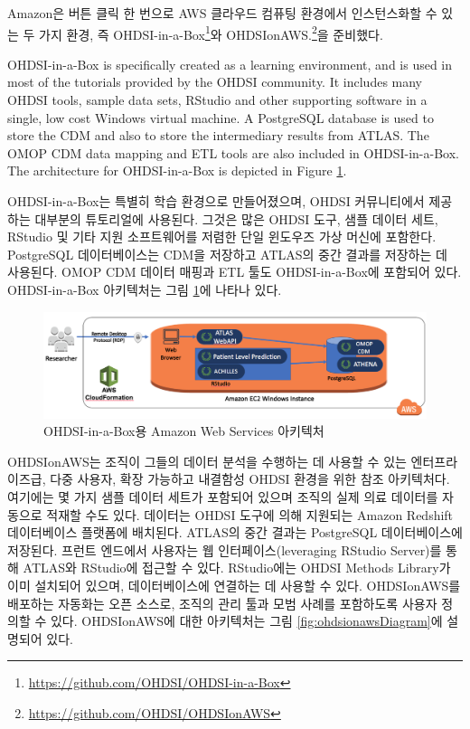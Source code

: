 \documentclass[11pt]{book}
\let\rmarkdownfootnote\footnote%
\def\footnote{\protect\rmarkdownfootnote}
\theoremstyle{definition}
\theoremstyle{definition}
\theoremstyle{definition}
\theoremstyle{remark}
\begin{document}
Amazon은 버튼 클릭 한 번으로 AWS 클라우드 컴퓨팅 환경에서 인스턴스화할
수 있는 두 가지 환경, 즉 OHDSI-in-a-Box\footnote{\url{https://github.com/OHDSI/OHDSI-in-a-Box}}와
OHDSIonAWS.\footnote{\url{https://github.com/OHDSI/OHDSIonAWS}}을
준비했다. 

OHDSI-in-a-Box is specifically created as a learning environment, and is
used in most of the tutorials provided by the OHDSI community. It
includes many OHDSI tools, sample data sets, RStudio and other
supporting software in a single, low cost Windows virtual machine. A
PostgreSQL database is used to store the CDM and also to store the
intermediary results from ATLAS. The OMOP CDM data mapping and ETL tools
are also included in OHDSI-in-a-Box. The architecture for OHDSI-in-a-Box
is depicted in Figure \ref{fig:ohdsiinaboxDiagram}.

OHDSI-in-a-Box는 특별히 학습 환경으로 만들어졌으며, OHDSI 커뮤니티에서
제공하는 대부분의 튜토리얼에 사용된다. 그것은 많은 OHDSI 도구, 샘플
데이터 세트, RStudio 및 기타 지원 소프트웨어를 저렴한 단일 윈도우즈 가상
머신에 포함한다. PostgreSQL 데이터베이스는 CDM을 저장하고 ATLAS의 중간
결과를 저장하는 데 사용된다. OMOP CDM 데이터 매핑과 ETL 툴도
OHDSI-in-a-Box에 포함되어 있다. OHDSI-in-a-Box 아키텍처는 그림
\ref{fig:ohdsiinaboxDiagram}에 나타나 있다.

\begin{figure}

{\centering \includegraphics[width=1\linewidth]{images/OhdsiAnalyticsTools/OHDSI-in-a-BoxDiagram} 

}

\caption{OHDSI-in-a-Box용 Amazon Web Services 아키텍처}\label{fig:ohdsiinaboxDiagram}
\end{figure}

OHDSIonAWS는 조직이 그들의 데이터 분석을 수행하는 데 사용할 수 있는
엔터프라이즈급, 다중 사용자, 확장 가능하고 내결함성 OHDSI 환경을 위한
참조 아키텍처다. 여기에는 몇 가지 샘플 데이터 세트가 포함되어 있으며
조직의 실제 의료 데이터를 자동으로 적재할 수도 있다. 데이터는 OHDSI
도구에 의해 지원되는 Amazon Redshift 데이터베이스 플랫폼에 배치된다.
ATLAS의 중간 결과는 PostgreSQL 데이터베이스에 저장된다. 프런트 엔드에서
사용자는 웹 인터페이스(leveraging RStudio Server)를 통해 ATLAS와
RStudio에 접근할 수 있다. RStudio에는 OHDSI Methods Library가 이미
설치되어 있으며, 데이터베이스에 연결하는 데 사용할 수 있다. OHDSIonAWS를
배포하는 자동화는 오픈 소스로, 조직의 관리 툴과 모범 사례를 포함하도록
사용자 정의할 수 있다. OHDSIonAWS에 대한 아키텍처는 그림
\ref{fig:ohdsionawsDiagram}에 설명되어 있다.
\end{document}
